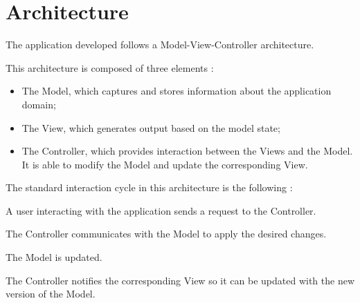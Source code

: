 
\chapter{Architecture}
\label{chapter:architecture}

The application developed follows a Model-View-Controller architecture.

This architecture is composed of three elements \cite{krasner1988description}:
\begin{itemize}
\item The Model, which captures and stores information about the application domain;
\item The View, which generates output based on the model state;
\item The Controller, which provides interaction between the Views and the Model. It is able to modify the Model and update the corresponding View.
\end{itemize}

The standard interaction cycle in this architecture is the following \cite{krasner1988description,reenskaug2009dci}:

A user interacting with the application sends a request to the Controller.

The Controller communicates with the Model to apply the desired changes.

The Model is updated.

The Controller notifies the corresponding View so it can be updated with the new version of the Model.

